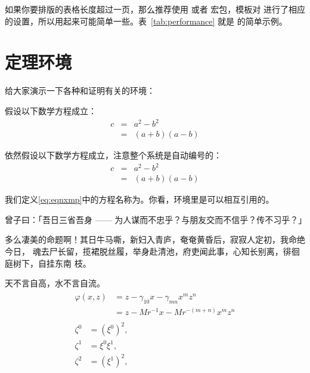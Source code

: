 如果你要排版的表格长度超过一页，那么推荐使用  或者 宏包，模板对  进行了相应的设置，所以用起来可能简单一些。表~\ref{tab:performance} 就是  的简单示例。

\section{定理环境}
\label{sec:theorem}

给大家演示一下各种和证明有关的环境：

\begin{assumption}
	假设以下数学方程成立：
	\begin{eqnarray}
	\label{eq:eqnxmp}
	c & = & a^2 - b^2\\
	& = & (a+b)(a-b)
	\end{eqnarray}
\end{assumption}

\begin{assumption}
	依然假设以下数学方程成立，注意整个系统是自动编号的：
	\begin{eqnarray}
	\label{eq:eqnxmp2}
	c & = & a^2 - b^2\\
	& = & (a+b)(a-b)
	\end{eqnarray}
\end{assumption}

\begin{definition}
	我们定义\ref{eq:eqnxmp}中的方程名称为\PRCthesis 。你看，环境里是可以相互引用的。
\end{definition}

\begin{proposition}
	曾子曰：「吾日三省吾身 —— 为人谋而不忠乎？与朋友交而不信乎？传不习乎？」
\end{proposition}

多么凄美的命题啊！其日牛马嘶，新妇入青庐，奄奄黄昏后，寂寂人定初，我命绝今日，
魂去尸长留，揽裙脱丝履，举身赴清池，府吏闻此事，心知长别离，徘徊庭树下，自挂东南
枝。

\begin{remark}
	天不言自高，水不言自流。
	\begin{gather*}
	\begin{split} 
	\varphi(x,z)
	&=z-\gamma_{10}x-\gamma_{mn}x^mz^n\\
	&=z-Mr^{-1}x-Mr^{-(m+n)}x^mz^n
	\end{split}\\[6pt]
	\begin{align} \zeta^0&=(\xi^0)^2,\\
	\zeta^1 &=\xi^0\xi^1,\\
	\zeta^2 &=(\xi^1)^2,
	\end{align}
	\end{gather*}
\end{remark}

